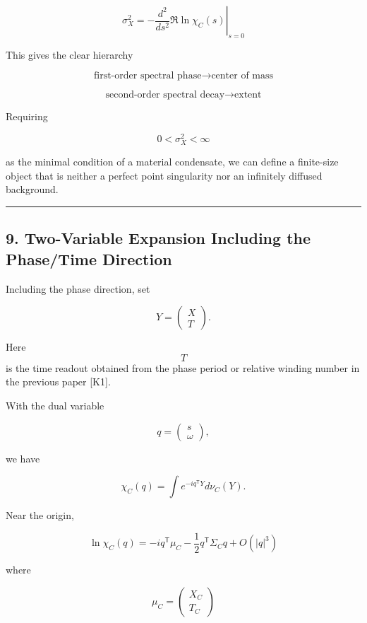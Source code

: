 \documentclass[
  a4paper,
]{article}
\begin{document}
\[
\boxed{
\sigma_X^2
=
-
\left.
\frac{d^2}{ds^2}
\Re\ln\chi_C(s)
\right|_{s=0}
}
\tag{24}
\]

This gives the clear hierarchy

\[
\boxed{
\text{first-order spectral phase}
\longrightarrow
\text{center of mass}
}
\]

\[
\boxed{
\text{second-order spectral decay}
\longrightarrow
\text{extent}
}
\]

Requiring

\[
0<\sigma_X^2<\infty
\tag{25}
\]

as the minimal condition of a material condensate, we can define a
finite-size object that is neither a perfect point singularity nor an
infinitely diffused background.

\begin{center}\rule{0.5\linewidth}{0.5pt}\end{center}

\subsection{9. Two-Variable Expansion Including the Phase/Time
Direction}\label{two-variable-expansion-including-the-phasetime-direction}

Including the phase direction, set

\[
Y=
\begin{pmatrix}
X\\
T
\end{pmatrix}.
\]

Here \[T\] is the time readout obtained from the phase period or
relative winding number in the previous paper {[}K1{]}.

With the dual variable

\[
q=
\begin{pmatrix}
s\\
\omega
\end{pmatrix},
\]

we have

\[
\chi_C(q)
=
\int
 e^{-iq^{\mathsf T}Y}
d\nu_C(Y).
\tag{26}
\]

Near the origin,

\[
\boxed{
\ln\chi_C(q)
=
-iq^{\mathsf T}\mu_C
-
\frac12
q^{\mathsf T}
\Sigma_C
q
+
O(|q|^3)
}
\tag{27}
\]

where

\[
\mu_C
=
\begin{pmatrix}
X_C\\
T_C
\end{pmatrix}
\]
\end{document}
